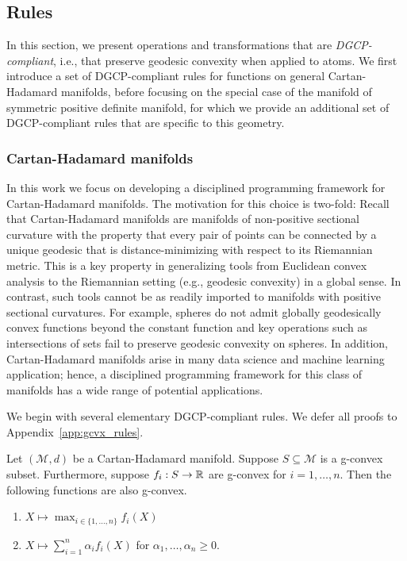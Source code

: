 \documentclass[twoside,11pt]{article}
\begin{document}
\subsection{Rules}
In this section, we present operations and transformations that are \emph{DGCP-compliant}, i.e., that preserve geodesic convexity when applied to atoms. 
We first introduce a set of DGCP-compliant rules for functions on general Cartan-Hadamard manifolds, before focusing on the special case of the manifold of symmetric positive definite manifold, for which we provide an additional set of DGCP-compliant rules that are specific to this geometry.


\subsubsection{Cartan-Hadamard manifolds}
In this work we focus on developing a disciplined programming framework for Cartan-Hadamard manifolds. The motivation for this choice is two-fold:
Recall that Cartan-Hadamard manifolds are manifolds of non-positive sectional curvature with the property that every pair of points can be connected by a unique geodesic that is distance-minimizing with respect to its Riemannian metric. This is a key property in generalizing tools from Euclidean convex analysis to the Riemannian setting (e.g., geodesic convexity) in a global sense. In contrast, such tools cannot be as readily imported to manifolds with positive sectional curvatures. For example, spheres do not admit globally geodesically convex functions beyond the constant function and key operations such as intersections of sets fail to preserve geodesic convexity on spheres. In addition, Cartan-Hadamard manifolds arise in many data science and machine learning application; hence, a disciplined programming framework for this class of manifolds has a wide range of potential applications.

We begin with several elementary DGCP-compliant rules. We defer all proofs to Appendix~\ref{app:gcvx_rules}.

\begin{prop}\label{prop:coniccomb_pwmax}
    Let $(\mathcal{M}, d)$ be a Cartan-Hadamard manifold. Suppose $S \subseteq \mathcal{M}$ is a g-convex subset. Furthermore, suppose $f_i: S \to \mathbb{R}$ are g-convex for $i= 1, \ldots, n$. Then the following functions are also g-convex.
     \begin{enumerate}
        \item $X \mapsto \max_{i \in \{1,\ldots, n\}}f_i(X)$
        \item $X \mapsto \sum_{i=1}^n \alpha_i f_i(X) $ for $\alpha_1, \ldots, \alpha_n  \geq 0$.
    \end{enumerate}
\end{prop}
\end{document}
